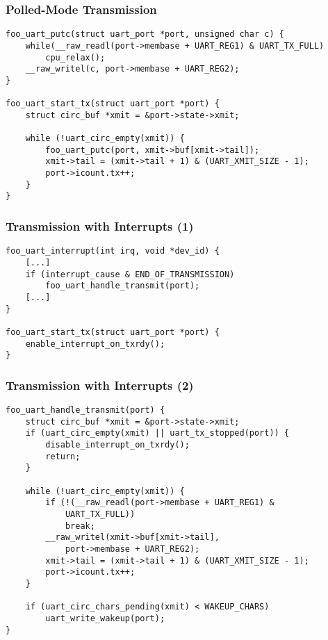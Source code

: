\begin{frame}[fragile]
  \frametitle{Polled-Mode Transmission}
\begin{verbatim}
foo_uart_putc(struct uart_port *port, unsigned char c) {
    while(__raw_readl(port->membase + UART_REG1) & UART_TX_FULL)
        cpu_relax();
    __raw_writel(c, port->membase + UART_REG2);
}

foo_uart_start_tx(struct uart_port *port) {
    struct circ_buf *xmit = &port->state->xmit;

    while (!uart_circ_empty(xmit)) {
        foo_uart_putc(port, xmit->buf[xmit->tail]);
        xmit->tail = (xmit->tail + 1) & (UART_XMIT_SIZE - 1);
        port->icount.tx++;
    }
}
\end{verbatim}
\end{frame}

\begin{frame}[fragile]
  \frametitle{Transmission with Interrupts (1)}
\begin{verbatim}
foo_uart_interrupt(int irq, void *dev_id) {
    [...]
    if (interrupt_cause & END_OF_TRANSMISSION)
        foo_uart_handle_transmit(port);
    [...]
}

foo_uart_start_tx(struct uart_port *port) {
    enable_interrupt_on_txrdy();
}
\end{verbatim}
\end{frame}

\begin{frame}[fragile]
\frametitle{Transmission with Interrupts (2)}
\begin{verbatim}
foo_uart_handle_transmit(port) {
    struct circ_buf *xmit = &port->state->xmit;
    if (uart_circ_empty(xmit) || uart_tx_stopped(port)) {
        disable_interrupt_on_txrdy();
        return;
    }

    while (!uart_circ_empty(xmit)) {
        if (!(__raw_readl(port->membase + UART_REG1) &
            UART_TX_FULL))
            break;
        __raw_writel(xmit->buf[xmit->tail],
            port->membase + UART_REG2);
        xmit->tail = (xmit->tail + 1) & (UART_XMIT_SIZE - 1);
        port->icount.tx++;
    }

    if (uart_circ_chars_pending(xmit) < WAKEUP_CHARS)
        uart_write_wakeup(port);
}
\end{verbatim}
\end{frame}

